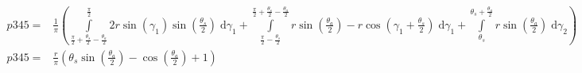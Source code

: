 \begin{align}
    p345 =&\frac{1}{\pi} \left(\int\limits_{\frac{\pi}{2} + \frac{\theta_{s}}{2} - \frac{\theta_{a}}{2}}^{\frac{\pi}{2}}2 r \sin{\left (\gamma_{1} \right )} \sin{\left (\frac{\theta_{s}}{2} \right )}\;\mathrm{d}\gamma_{1}+\int\limits_{\frac{\pi}{2} - \frac{\theta_{s}}{2}}^{\frac{\pi}{2} + \frac{\theta_{s}}{2} - \frac{\theta_{a}}{2}}r \sin{\left (\frac{\theta_{a}}{2} \right )} - r \cos{\left (\gamma_{1} + \frac{\theta_{s}}{2} \right )}\;\mathrm{d}\gamma_{1}+\int\limits_{\theta_{s}}^{\theta_{s} + \frac{\theta_{a}}{2}}r \sin{\left (\frac{\theta_{a}}{2} \right )}\;\mathrm{d}\gamma_{2}\right)\\
    p345 =& \frac{r}{\pi} \left(\theta_{s} \sin{\left (\frac{\theta_{a}}{2} \right )} - \cos{\left (\frac{\theta_{a}}{2} \right )} + 1\right)
\end{align}